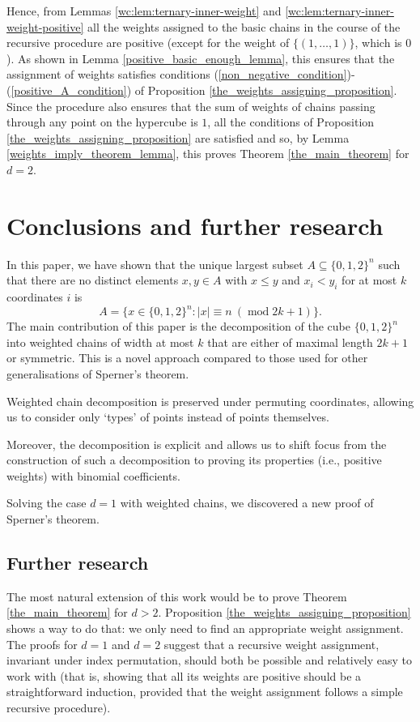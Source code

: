 \documentclass[11pt, reqno]{amsart}
\theoremstyle{remark}
\numberwithin{equation}{section}
\newcommand{\cube}{\{0, 1, 2\}^n}
\newcommand\modd{\operatorname{mod}}
\newcommand{\theonepoint}{(1, \ldots, 1)}
\begin{document}
Hence, from Lemmas \ref{wc:lem:ternary-inner-weight} and \ref{wc:lem:ternary-inner-weight-positive} all the weights assigned to the basic chains in the course of the recursive procedure are positive (except for the weight of $\{\theonepoint\}$, which is $0$). As shown in Lemma \ref{positive_basic_enough_lemma}, this ensures that the assignment of weights satisfies conditions (\ref{non_negative_condition})-(\ref{positive_A_condition}) of Proposition \ref{the_weights_assigning_proposition}. Since the procedure also ensures that the sum of weights of chains passing through any point on the hypercube is $1$, all the conditions of Proposition \ref{the_weights_assigning_proposition} are satisfied and so, by Lemma \ref{weights_imply_theorem_lemma}, this proves Theorem \ref{the_main_theorem} for $d=2$.

\section{Conclusions and further research}
\label{section_conclusion}

In this paper, we have shown that the unique largest subset $A \subseteq \{0, 1, 2\}^n$ such that there are no distinct elements $x, y \in A$ with $x \leqslant y$ and $x_i < y_i$ for at most $k$ coordinates $i$ is
\begin{equation}
    A = \Big\{ x \in \{0,1, 2\}^n : \vert x\vert  \equiv n \ (\modd 2k+1) \Big\}.
\end{equation}
The main contribution of this paper is the decomposition of the cube $\cube$ into weighted chains of width at most $k$ that are either of maximal length $2k+1$ or symmetric. This is a novel approach compared to those used for other generalisations of Sperner's theorem. 

Weighted chain decomposition is preserved under permuting coordinates, allowing us to consider only `types' of points instead of points themselves.

Moreover, the decomposition is explicit and allows us to shift focus from the construction of such a decomposition to proving its properties (i.e., positive weights) with binomial coefficients.

Solving the case $d=1$ with weighted chains, we discovered a new proof of Sperner's theorem.

\subsection{Further research}
The most natural extension of this work would be to prove Theorem \ref{the_main_theorem} for $d>2$. Proposition \ref{the_weights_assigning_proposition} shows a way to do that: we only need to find an appropriate weight assignment. The proofs for $d=1$ and $d=2$ suggest that a recursive weight assignment, invariant under index permutation, should both be possible and relatively easy to work with (that is, showing that all its weights are positive should be a straightforward induction, provided that the weight assignment follows a simple recursive procedure).
\end{document}
